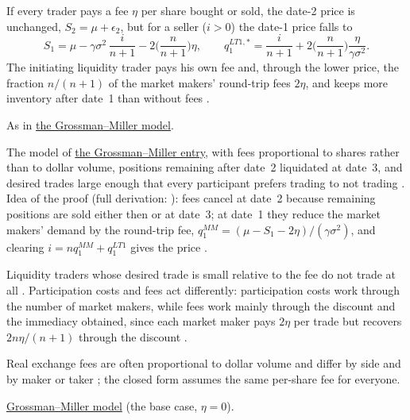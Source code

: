 \begin{qfresult}\label{res:grossman-miller-trading-fees}
 If every trader pays a fee $\eta$ per share bought or sold, the date-2 price is unchanged, $S_2=\mu+\epsilon_2$, but for a seller ($i>0$) the date-1 price falls to \citep[chap.~``A Primer on the Microstructure of Financial Markets'', pp.~25--26]{crypto-cartea}
\[ S_1=\mu-\gamma\sigma^2\,\frac{i}{n+1}-2\Big(\frac{n}{n+1}\Big)\eta, \qquad q_1^{LT1,\ast}=\frac{i}{n+1}+2\Big(\frac{n}{n+1}\Big)\frac{\eta}{\gamma\sigma^2}. \]
The initiating liquidity trader pays his own fee and, through the lower price, the fraction $n/(n+1)$ of the market makers' round-trip fees $2\eta$, and keeps more inventory after date~1 than without fees \citep[same chap., p.~26]{crypto-cartea}.

 As in \hyperref[mod:grossman-miller]{the Grossman--Miller model}.

 The model of \hyperref[mod:grossman-miller]{the Grossman--Miller entry}, with fees proportional to shares rather than to dollar volume, positions remaining after date~2 liquidated at date~3, and desired trades large enough that every participant prefers trading to not trading \citep[same chap., p.~25]{crypto-cartea}. Idea of the proof (full derivation: ): fees cancel at date~2 because remaining positions are sold either then or at date~3; at date~1 they reduce the market makers' demand by the round-trip fee, $q_1^{MM}=(\mu-S_1-2\eta)/(\gamma\sigma^2)$, and clearing $i=nq_1^{MM}+q_1^{LT1}$ gives the price \citep[same chap., pp.~25--26]{crypto-cartea}.

 Liquidity traders whose desired trade is small relative to the fee do not trade at all \citep[same chap., p.~25]{crypto-cartea}. Participation costs and fees act differently: participation costs work through the number of market makers, while fees work mainly through the discount and the immediacy obtained, since each market maker pays $2\eta$ per trade but recovers $2n\eta/(n+1)$ through the discount \citep[same chap., p.~26]{crypto-cartea}.

 Real exchange fees are often proportional to dollar volume and differ by side and by maker or taker \citep[same chap., p.~25]{crypto-cartea}; the closed form assumes the same per-share fee for everyone.

 \hyperref[mod:grossman-miller]{Grossman--Miller model} (the base case, $\eta=0$).

\end{qfresult}

